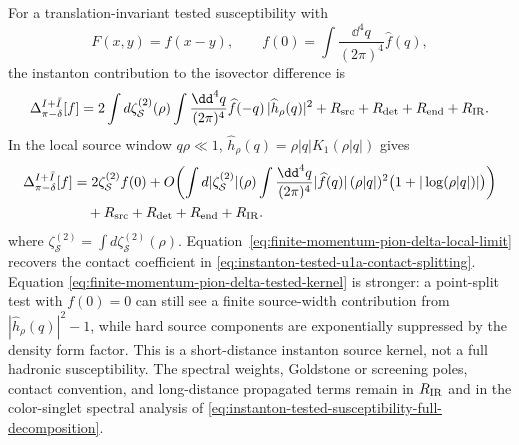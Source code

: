 \begin{controlledapproximation}
For a translation-invariant tested susceptibility with
\[
  F(x,y)=f(x-y),\qquad
  f(0)=\int\frac{\dd^4q}{(2\pi)^4}\widehat f(q),
\]
the instanton contribution to the isovector difference is
\begin{equation}
  \Delta_{\pi-\delta}^{I+\bar I}[f]
  =
  2
  \int d\zeta_{\mathcal S}^{(2)}(\rho)
  \int\frac{\dd^4q}{(2\pi)^4}
  \widehat f(-q)\,
  |\widehat h_\rho(q)|^2
  +R_{\rm src}+R_{\rm det}+R_{\rm end}+R_{\rm IR}.
  \label{eq:finite-momentum-pion-delta-tested-kernel}
\end{equation}
In the local source window \(q\rho\ll1\),
\(\widehat h_\rho(q)=\rho|q|K_1(\rho|q|)\) gives
\begin{equation}
\begin{aligned}
  \Delta_{\pi-\delta}^{I+\bar I}[f]
  &=
  2\zeta_{\mathcal S}^{(2)} f(0)
  +
  O\!\left(
    \int d|\zeta_{\mathcal S}^{(2)}|(\rho)
    \int\frac{\dd^4q}{(2\pi)^4}
      |\widehat f(q)|\,(\rho|q|)^2
      \bigl(1+|\log(\rho|q|)|\bigr)
  \right)
  \\
  &\quad
  +R_{\rm src}+R_{\rm det}+R_{\rm end}+R_{\rm IR}.
\end{aligned}
  \label{eq:finite-momentum-pion-delta-local-limit}
\end{equation}
where
\(\zeta_{\mathcal S}^{(2)}=\int d\zeta_{\mathcal S}^{(2)}(\rho)\).
Equation~\eqref{eq:finite-momentum-pion-delta-local-limit} recovers the
contact coefficient in
\eqref{eq:instanton-tested-u1a-contact-splitting}.  Equation
\eqref{eq:finite-momentum-pion-delta-tested-kernel} is stronger: a
point-split test with \(f(0)=0\) can still see a finite source-width
contribution from \(|\widehat h_\rho(q)|^2-1\), while hard source components
are exponentially suppressed by the density form factor.  This is a
short-distance instanton source kernel, not a full hadronic susceptibility.
The spectral weights, Goldstone or screening poles, contact convention, and
long-distance propagated terms remain in \(R_{\rm IR}\) and in the
color-singlet spectral analysis of
\eqref{eq:instanton-tested-susceptibility-full-decomposition}.
\end{controlledapproximation}

